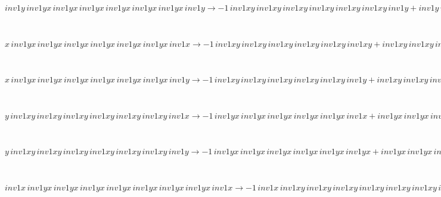 \begin{minipage}{6in}
$
inv1y\,
 inv1yx\,
 inv1yx\,
 inv1yx\,
 inv1yx\,
 inv1yx\,
 inv1yx\,
 inv1y\rightarrow -1\,
 inv1xy\,
 inv1xy\,
 inv1xy\,
 inv1xy\,
 inv1xy\,
 inv1xy\,
 inv1y + inv1y\,
 inv1yx\,
 inv1yx\,
 inv1yx\,
 inv1yx\,
 inv1yx\,
 inv1yx + inv1y\,
 inv1xy\,
 inv1xy\,
 inv1xy\,
 inv1xy\,
 inv1xy\,
 inv1xy\,
 inv1y
$
\end{minipage}\medskip \\
\begin{minipage}{6in}
$
x\,
 inv1yx\,
 inv1yx\,
 inv1yx\,
 inv1yx\,
 inv1yx\,
 inv1yx\,
 inv1x\rightarrow -1\,
 inv1xy\,
 inv1xy\,
 inv1xy\,
 inv1xy\,
 inv1xy\,
 inv1xy + inv1xy\,
 inv1xy\,
 inv1xy\,
 inv1xy\,
 inv1xy\,
 inv1xy\,
 inv1x
$
\end{minipage}\medskip \\
\begin{minipage}{6in}
$
x\,
 inv1yx\,
 inv1yx\,
 inv1yx\,
 inv1yx\,
 inv1yx\,
 inv1yx\,
 inv1y\rightarrow -1\,
 inv1xy\,
 inv1xy\,
 inv1xy\,
 inv1xy\,
 inv1xy\,
 inv1y + inv1xy\,
 inv1xy\,
 inv1xy\,
 inv1xy\,
 inv1xy\,
 inv1xy\,
 inv1y + x\,
 inv1yx\,
 inv1yx\,
 inv1yx\,
 inv1yx\,
 inv1yx\,
 inv1yx
$
\end{minipage}\medskip \\
\begin{minipage}{6in}
$
y\,
 inv1xy\,
 inv1xy\,
 inv1xy\,
 inv1xy\,
 inv1xy\,
 inv1xy\,
 inv1x\rightarrow -1\,
 inv1yx\,
 inv1yx\,
 inv1yx\,
 inv1yx\,
 inv1yx\,
 inv1x + inv1yx\,
 inv1yx\,
 inv1yx\,
 inv1yx\,
 inv1yx\,
 inv1yx\,
 inv1x + y\,
 inv1xy\,
 inv1xy\,
 inv1xy\,
 inv1xy\,
 inv1xy\,
 inv1xy
$
\end{minipage}\medskip \\
\begin{minipage}{6in}
$
y\,
 inv1xy\,
 inv1xy\,
 inv1xy\,
 inv1xy\,
 inv1xy\,
 inv1xy\,
 inv1y\rightarrow -1\,
 inv1yx\,
 inv1yx\,
 inv1yx\,
 inv1yx\,
 inv1yx\,
 inv1yx + inv1yx\,
 inv1yx\,
 inv1yx\,
 inv1yx\,
 inv1yx\,
 inv1yx\,
 inv1y
$
\end{minipage}\medskip \\
\begin{minipage}{6in}
$
inv1x\,
 inv1yx\,
 inv1yx\,
 inv1yx\,
 inv1yx\,
 inv1yx\,
 inv1yx\,
 inv1yx\,
 inv1x\rightarrow -1\,
 inv1x\,
 inv1xy\,
 inv1xy\,
 inv1xy\,
 inv1xy\,
 inv1xy\,
 inv1xy\,
 inv1xy + inv1yx\,
 inv1yx\,
 inv1yx\,
 inv1yx\,
 inv1yx\,
 inv1yx\,
 inv1yx\,
 inv1x + inv1x\,
 inv1xy\,
 inv1xy\,
 inv1xy\,
 inv1xy\,
 inv1xy\,
 inv1xy\,
 inv1xy\,
 inv1x
$
\end{minipage}\medskip \\
